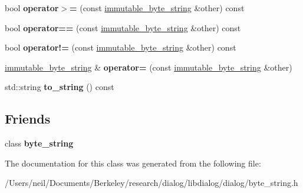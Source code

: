 \begin{DoxyCompactItemize}
bool {\bfseries operator$>$=} (const \hyperlink{classdialog_1_1immutable__byte__string}{immutable\+\_\+byte\+\_\+string} \&other) const
\item 
\mbox{\label{classdialog_1_1immutable__byte__string_a374adff900d2778bccc12dffa49ce516}} 
bool {\bfseries operator==} (const \hyperlink{classdialog_1_1immutable__byte__string}{immutable\+\_\+byte\+\_\+string} \&other) const
\item 
\mbox{\label{classdialog_1_1immutable__byte__string_ab809ee486bca01c29674ff1696128cbc}} 
bool {\bfseries operator!=} (const \hyperlink{classdialog_1_1immutable__byte__string}{immutable\+\_\+byte\+\_\+string} \&other) const
\item 
\mbox{\label{classdialog_1_1immutable__byte__string_ab7339c313a10ec8cad9304ba37338048}} 
\hyperlink{classdialog_1_1immutable__byte__string}{immutable\+\_\+byte\+\_\+string} \& {\bfseries operator=} (const \hyperlink{classdialog_1_1immutable__byte__string}{immutable\+\_\+byte\+\_\+string} \&other)
\item 
\mbox{\label{classdialog_1_1immutable__byte__string_ac5b5542c4990b2818e9f37991981fb46}} 
std\+::string {\bfseries to\+\_\+string} () const
\end{DoxyCompactItemize}
\subsection*{Friends}
\begin{DoxyCompactItemize}
\item 
\mbox{\label{classdialog_1_1immutable__byte__string_a9fecc030b26cd64fe5db1e9d3428dcd2}} 
class {\bfseries byte\+\_\+string}
\end{DoxyCompactItemize}


The documentation for this class was generated from the following file\+:\begin{DoxyCompactItemize}
\item 
/\+Users/neil/\+Documents/\+Berkeley/research/dialog/libdialog/dialog/byte\+\_\+string.\+h\end{DoxyCompactItemize}
